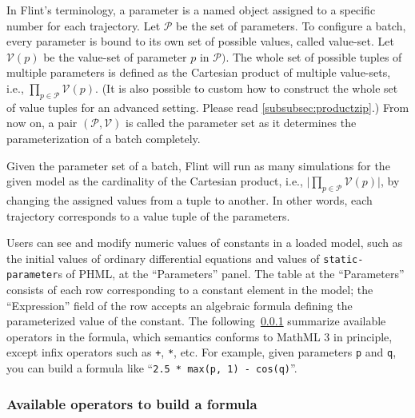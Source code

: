 \documentclass[a4paper,10pt]{report}
\begin{document}
In Flint's terminology, a parameter is a named object assigned to a specific
number for each trajectory.
Let $\mathcal{P}$ be the set of parameters.
To configure a batch, every parameter is bound to its own set of possible
values, called value-set.
Let $\mathcal{V}(p)$ be the value-set of parameter $p$ in $\mathcal{P})$.
The whole set of possible tuples of multiple parameters is defined as the
Cartesian product of multiple value-sets, i.e., $\prod_{p \in \mathcal{P}}
\mathcal{V}(p)$.
(It is also possible to custom how to construct the whole set of value tuples
for an advanced setting. Please read \ref{subsubsec:productzip}.)
From now on, a pair $(\mathcal{P}, \mathcal{V})$ is called the parameter set as
it determines the parameterization of a batch completely.

Given the parameter set of a batch, Flint will run as many simulations for the
given model as the cardinality of the Cartesian product, i.e.,
$\lvert \prod_{p \in \mathcal{P}} \mathcal{V}(p) \rvert$, by changing the
assigned values from a tuple to another.
In other words, each trajectory corresponds to a value tuple of the parameters.

Users can see and modify numeric values of constants in a loaded model,
such as the initial values of ordinary differential equations and values of
\verb|static-parameter|s of PHML, at the ``Parameters'' panel.
The table at the ``Parameters'' consists of each row corresponding to a constant
element in the model; the ``Expression'' field of the row accepts an algebraic
formula defining the parameterized value of the constant.
The following~\ref{subsubsec:formula-operator} summarize available operators in
the formula, which semantics conforms to MathML 3 \cite{MathML} in principle,
except infix operators such as \verb|+|, \verb|*|, etc.
For example, given parameters \verb|p| and \verb|q|, you can build a formula
like ``\verb|2.5 * max(p, 1) - cos(q)|''.

\subsubsection{Available operators to build a formula}\label{subsubsec:formula-operator}
\end{document}
